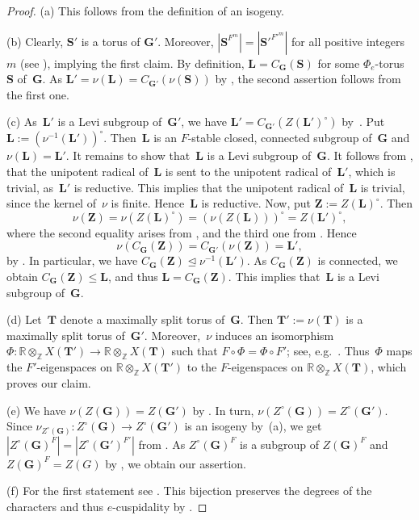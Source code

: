 \documentclass[12pt]{amsart}
\newcommand{\bG}{{\mathbf{G}}}      %
\newcommand{\bL}{{\mathbf{L}}}
\newcommand{\bT}{{\mathbf{T}}}
\newcommand{\bS}{{\mathbf{S}}}
\newcommand{\bZ}{{\mathbf{Z}}}
\theoremstyle{theorem}
\theoremstyle{definition}
\theoremstyle{remark}
\begin{document}
\begin{proof}
(a) This follows from the definition of an isogeny.

(b) Clearly, $\bS'$ is a torus of $\bG'$. Moreover, $|\bS^{F^m}| = 
|{\bS'}^{{F'}^m}|$ for all positive integers~$m$ (see
\cite[Proposition~$1.4.13$(c)]{GeMa}), implying the first claim.
By definition, $\bL = C_{\bG}( \bS )$ for some $\Phi_e$-torus~$\bS$ of~$\bG$.
As $\bL' = \nu( \bL ) = C_{\bG'}( \nu( \bS ) )$ by 
\cite[Corollary~$2$ to Proposition~$11.14$]{Borel},
the second assertion follows from the first one. 

(c) As~$\bL'$ is a Levi subgroup of~$\bG'$, we have 
$\bL' = C_{\bG'}( Z( \bL' )^\circ )$ by~\cite[Corollary~$14.19$]{Borel}. 
Put $\bL := (\nu^{-1}( \bL' ))^\circ$.
Then~$\bL$ is an $F$-stable closed, connected subgroup of~$\bG$ and 
$\nu( \bL ) = \bL'$. 
It remains to show that~$\bL$ is a Levi subgroup of~$\bG$. It follows from 
\cite[$11.14$(1)]{Borel}, that the unipotent radical of~$\bL$ is sent to 
the unipotent radical of~$\bL'$, which is trivial, as~$\bL'$ is reductive.
This implies that the unipotent radical of~$\bL$ is trivial, since the kernel 
of~$\nu$ is finite. Hence~$\bL$ is reductive.  Now, put $\bZ := Z( \bL )^\circ$. 
Then 
$$\nu( \bZ ) = \nu( Z( \bL )^\circ ) = ( \nu( Z( \bL ) ) )^\circ  
= Z( \bL' )^\circ,$$ where the second equality arises from 
\cite[Proposition~$7.4$.B(c)]{Hum75}, and the third one from 
\cite[$1.3.10$(c)]{GeMa}. Hence 
$$\nu( C_{\bG}( \bZ ) ) = C_{\bG'}( \nu( \bZ ) ) = \bL',$$ 
by \cite[Corollary~$2$ to Proposition~$11.14$]{Borel}. In
particular, we have $C_{\bG}( \bZ ) \unlhd \nu^{-1}( \bL' )$. As $C_{\bG}( \bZ )$ is 
connected, we obtain $C_{\bG}( \bZ ) \leq \bL$, and thus $\bL = C_{\bG}( \bZ )$. 
This implies that~$\bL$ is a Levi subgroup of~$\bG$.

(d) Let~$\bT$ denote a maximally split torus of~$\bG$. Then $\bT' := \nu(\bT)$
is a maximally split torus of~$\bG'$. Moreover,~$\nu$ induces an isomorphism
$\Phi: \mathbb{R} \otimes_{\mathbb{Z}} X( \bT' ) \rightarrow 
\mathbb{R} \otimes_{\mathbb{Z}} X( \bT )$ such that
$F \circ \Phi = \Phi \circ F'$; see, e.g.\ \cite[Theorem~$2.4.8$]{DiMi2}.
Thus~$\Phi$ maps the $F'$-eigenspaces on
$\mathbb{R} \otimes_{\mathbb{Z}} X( \bT' )$ to the $F$-eigenspaces on
$\mathbb{R} \otimes_{\mathbb{Z}} X( \bT )$, which proves our claim.

(e) We have $\nu( Z( \bG ) ) = Z( \bG' )$ by \cite[$1.3.10$(c)]{GeMa}.
In turn, $\nu( Z^{\circ}( \bG ) ) = Z^{\circ}( \bG' )$. Since
$\nu_{Z^{\circ}( \bG )} : Z^{\circ}( \bG ) \rightarrow Z^{\circ}( \bG' )$ is an
isogeny by~(a), we get $|Z^{\circ}( \bG )^F| = |Z^{\circ}( \bG' )^{F'}|$ from
\cite[Proposition $1.4.13$(c)]{GeMa}. As $Z^{\circ}( \bG )^F$ is a subgroup
of $Z( \bG )^F$ and $Z( \bG )^F = Z( G )$ by \cite[Proposition $3.6.8$]{C2},
we obtain our assertion.

(f) For the first statement see \cite[Proposition~$2.3.15$]{GeMa}. 
This bijection preserves the degrees of the characters and thus $e$-cuspidality 
by \cite[Proposition~$2.9$]{BrouMaMi}.
\end{proof}
\end{document}
